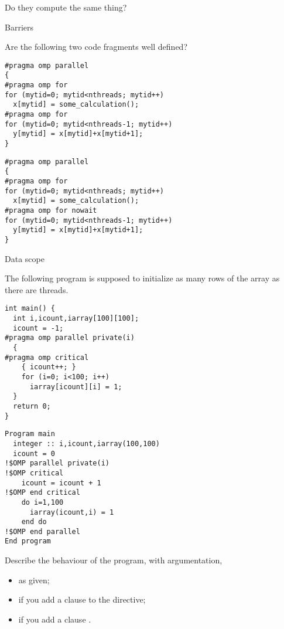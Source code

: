 Do they compute the same thing?

\vfill\pagebreak

 {Barriers}

Are the following two code fragments well defined?
\begin{multicols}{2}
\lstset{language=C}
\begin{lstlisting}
#pragma omp parallel 
{
#pragma omp for
for (mytid=0; mytid<nthreads; mytid++)
  x[mytid] = some_calculation();
#pragma omp for
for (mytid=0; mytid<nthreads-1; mytid++)
  y[mytid] = x[mytid]+x[mytid+1];
}
\end{lstlisting}
\columnbreak
\begin{lstlisting}
#pragma omp parallel 
{
#pragma omp for
for (mytid=0; mytid<nthreads; mytid++)
  x[mytid] = some_calculation();
#pragma omp for nowait
for (mytid=0; mytid<nthreads-1; mytid++)
  y[mytid] = x[mytid]+x[mytid+1];
}
\end{lstlisting}
\end{multicols}

 {Data scope}

The following program is supposed to initialize as many
rows of the array as there are threads.

\begin{multicols}{2}
\small
\lstset{language=C}
\begin{lstlisting}
int main() {
  int i,icount,iarray[100][100];
  icount = -1;
#pragma omp parallel private(i)
  {
#pragma omp critical
    { icount++; }
    for (i=0; i<100; i++) 
      iarray[icount][i] = 1;
  }
  return 0;
}
\end{lstlisting}
\columnbreak
\lstset{language=Fortran}
\begin{lstlisting}
Program main
  integer :: i,icount,iarray(100,100)
  icount = 0
!$OMP parallel private(i)
!$OMP critical
    icount = icount + 1
!$OMP end critical
    do i=1,100
      iarray(icount,i) = 1
    end do
!$OMP end parallel
End program
\end{lstlisting}
\end{multicols}

Describe the behaviour of the program, with argumentation,
\begin{itemize}
\item as given;
\item if you add a clause  to the  directive;
\item if you add a clause .
\end{itemize}

